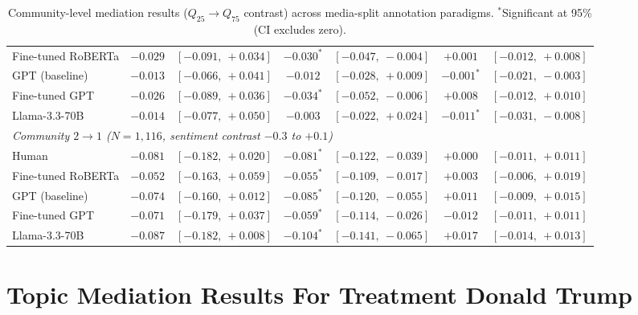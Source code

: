 \begin{table}[h]
\begin{tabular}{lcccccc}
Fine-tuned RoBERTa & $-0.029$ & $[-0.091,\ +0.034]$ & $\mathbf{-0.030^*}$ & $\mathbf{[-0.047,\ -0.004]}$ & $+0.001$ & $[-0.012,\ +0.008]$ \\
GPT (baseline)     & $-0.013$ & $[-0.066,\ +0.041]$ & $-0.012$ & $[-0.028,\ +0.009]$ & $\mathbf{-0.001^*}$ & $\mathbf{[-0.021,\ -0.003]}$ \\
Fine-tuned GPT     & $-0.026$ & $[-0.089,\ +0.036]$ & $\mathbf{-0.034^*}$ & $\mathbf{[-0.052,\ -0.006]}$ & $+0.008$ & $[-0.012,\ +0.010]$ \\
Llama-3.3-70B      & $-0.014$ & $[-0.077,\ +0.050]$ & $-0.003$ & $[-0.022,\ +0.024]$ & $\mathbf{-0.011^*}$ & $\mathbf{[-0.031,\ -0.008]}$ \\
\midrule
\multicolumn{7}{l}{\textit{Community $2 \to 1$ ($N=1{,}116$, sentiment contrast $-0.3$ to $+0.1$)}} \\
\midrule
Human              & $-0.081$ & $[-0.182,\ +0.020]$ & $\mathbf{-0.081^*}$ & $\mathbf{[-0.122,\ -0.039]}$ & $+0.000$ & $[-0.011,\ +0.011]$ \\
Fine-tuned RoBERTa & $-0.052$ & $[-0.163,\ +0.059]$ & $\mathbf{-0.055^*}$ & $\mathbf{[-0.109,\ -0.017]}$ & $+0.003$ & $[-0.006,\ +0.019]$ \\
GPT (baseline)     & $-0.074$ & $[-0.160,\ +0.012]$ & $\mathbf{-0.085^*}$ & $\mathbf{[-0.120,\ -0.055]}$ & $+0.011$ & $[-0.009,\ +0.015]$ \\
Fine-tuned GPT     & $-0.071$ & $[-0.179,\ +0.037]$ & $\mathbf{-0.059^*}$ & $\mathbf{[-0.114,\ -0.026]}$ & $-0.012$ & $[-0.011,\ +0.011]$ \\
Llama-3.3-70B      & $-0.087$ & $[-0.182,\ +0.008]$ & $\mathbf{-0.104^*}$ & $\mathbf{[-0.141,\ -0.065]}$ & $+0.017$ & $[-0.014,\ +0.013]$ \\
\bottomrule
\end{tabular}
\caption{Community-level mediation results ($Q_{25} \to Q_{75}$ contrast) across media-split annotation paradigms. $^*$Significant at 95\% (CI excludes zero).}
\label{tab:mediation_full_communities}
\end{table}

\section{Topic Mediation Results For Treatment Donald Trump}

